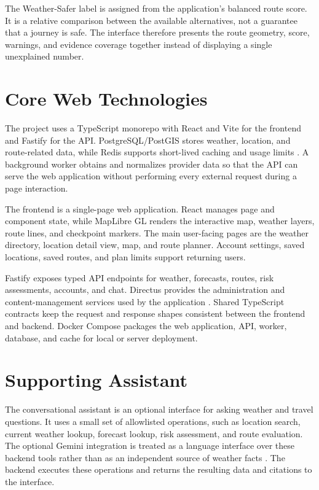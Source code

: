The Weather-Safer label is assigned from the application's balanced route score. It is a relative comparison between the available alternatives, not a guarantee that a journey is safe. The interface therefore presents the route geometry, score, warnings, and evidence coverage together instead of displaying a single unexplained number.

\section{Core Web Technologies}
The project uses a TypeScript monorepo with React and Vite for the frontend and Fastify for the API. PostgreSQL/PostGIS stores weather, location, and route-related data, while Redis supports short-lived caching and usage limits \cite{redis2024}. A background worker obtains and normalizes provider data so that the API can serve the web application without performing every external request during a page interaction.

The frontend is a single-page web application. React manages page and component state, while MapLibre GL \cite{maplibre2024} renders the interactive map, weather layers, route lines, and checkpoint markers. The main user-facing pages are the weather directory, location detail view, map, and route planner. Account settings, saved locations, saved routes, and plan limits support returning users.

Fastify \cite{fastify2024} exposes typed API endpoints for weather, forecasts, routes, risk assessments, accounts, and chat. Directus provides the administration and content-management services used by the application \cite{directus2024}. Shared TypeScript contracts keep the request and response shapes consistent between the frontend and backend. Docker Compose packages the web application, API, worker, database, and cache for local or server deployment.

\section{Supporting Assistant}
The conversational assistant is an optional interface for asking weather and travel questions. It uses a small set of allowlisted operations, such as location search, current weather lookup, forecast lookup, risk assessment, and route evaluation. The optional Gemini integration is treated as a language interface over these backend tools rather than as an independent source of weather facts \cite{googleFunctionCalling}. The backend executes these operations and returns the resulting data and citations to the interface.

